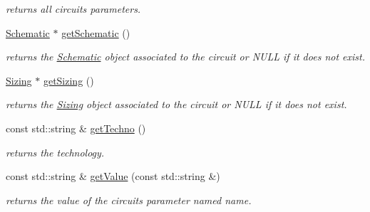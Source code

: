 \begin{DoxyCompactItemize}
\begin{DoxyCompactList}\small\item\em returns all circuit\textquotesingle{}s parameters. \end{DoxyCompactList}\item 
\mbox{\label{class_open_chams_1_1_circuit_af6f967a5685ac92fe760f4eb95c8c51f}} 
\mbox{\hyperlink{class_open_chams_1_1_schematic}{Schematic}} $\ast$ \mbox{\hyperlink{class_open_chams_1_1_circuit_af6f967a5685ac92fe760f4eb95c8c51f}{get\+Schematic}} ()
\begin{DoxyCompactList}\small\item\em returns the \mbox{\hyperlink{class_open_chams_1_1_schematic}{Schematic}} object associated to the circuit or N\+U\+LL if it does not exist. \end{DoxyCompactList}\item 
\mbox{\label{class_open_chams_1_1_circuit_a0ce52bc8747f684ec0123faa8ff97b6d}} 
\mbox{\hyperlink{class_open_chams_1_1_sizing}{Sizing}} $\ast$ \mbox{\hyperlink{class_open_chams_1_1_circuit_a0ce52bc8747f684ec0123faa8ff97b6d}{get\+Sizing}} ()
\begin{DoxyCompactList}\small\item\em returns the \mbox{\hyperlink{class_open_chams_1_1_sizing}{Sizing}} object associated to the circuit or N\+U\+LL if it does not exist. \end{DoxyCompactList}\item 
\mbox{\label{class_open_chams_1_1_circuit_a3538c326d799dd26fbb17c4ac6c4647e}} 
const std\+::string \& \mbox{\hyperlink{class_open_chams_1_1_circuit_a3538c326d799dd26fbb17c4ac6c4647e}{get\+Techno}} ()
\begin{DoxyCompactList}\small\item\em returns the technology. \end{DoxyCompactList}\item 
const std\+::string \& \mbox{\hyperlink{class_open_chams_1_1_circuit_a6650bf10e394fe2d6fa1d50e247da296}{get\+Value}} (const std\+::string \&)
\begin{DoxyCompactList}\small\item\em returns the value of the circuit\textquotesingle{}s parameter named {\ttfamily name}. \end{DoxyCompactList}\item 

\end{DoxyCompactItemize}
